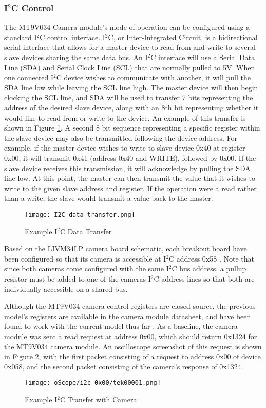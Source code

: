 \subsubsection{I$^2$C Control} 
The MT9V034 Camera module's mode of operation can be configured using a standard I$^2$C control interface. I$^2$C, or Inter-Integrated Circuit, is a bidirectional serial interface that allows for a master device to read from and write to several slave devices sharing the same data bus. An I$^2$C interface will use a Serial Data Line (SDA) and Serial Clock Line (SCL) that are normally pulled to 5V. When one connected I$^2$C device wishes to communicate with another, it will pull the SDA line low while leaving the SCL line high. The master device will then begin clocking the SCL line, and SDA will be used to transfer 7 bits representing the address of the desired slave device, along with an 8th bit representing whether it would like to read from or write to the device. An example of this transfer is shown in Figure \ref{I2Cexample}. A second 8 bit sequence representing a specific register within the slave device may also be transmitted following the device address. For example, if the master device wishes to write to slave device 0x40 at register 0x00, it will transmit 0x41 (address 0x40 and WRITE), followed by 0x00. If the slave device receives this transmission, it will acknowledge by pulling the SDA line low. At this point, the master can then transmit the value that it wishes to write to the given slave address and register. If the operation were a read rather than a write, the slave would transmit a value back to the master.  
\par
\begin{figure}[H]
	\centerline{\texttt{[image: I2C\_data\_transfer.png]}}
	\caption{Example I$^2$C Data Transfer}
	\label{I2Cexample}
\end{figure}

Based on the LIVM34LP camera board schematic, each breakout board have been configured so that its camera is accessible at I$^2$C address 0x58 \cite{livm34lp,mt9v034}. Note that since both cameras come configured with the same I$^2$C bus address, a pullup resistor must be added to one of the cameras I$^2$C address lines so that both are individually accessible on a shared bus.
\par
Although the MT9V034 camera control registers are closed source, the previous model's registers are available in the camera module datasheet, and have been found to work with the current model thus far \cite{mt9v032}. As a baseline, the camera module was sent a read request at address 0x00, which should return 0x1324 for the MT9V034 camera module. An oscilloscope screenshot of this request is shown in Figure \ref{camVersion}, with the first packet consisting of a request to address 0x00 of device 0x058, and the second packet consisting of the camera's response of 0x1324. 
\begin{figure}[H]
	\centerline{\texttt{[image: oScope/i2c\_0x00/tek00001.png]}}
	\caption{Example I$^2$C Transfer with Camera}
	\label{camVersion}
\end{figure}

